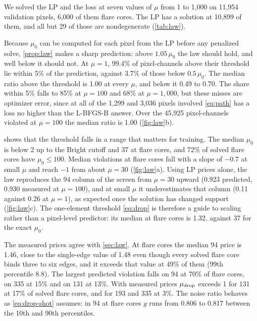 We solved the LP and the loss at seven values of $\mu$ from 1 to 1,000 on 11,954 validation pixels, 6,000 of them flare cores. The LP has a solution at 10,899 of them, and all but 29 of those are nondegenerate (\cref{tab:law}).

Because $\mu_0$ can be computed for each pixel from the LP before any penalized solve, \cref{prop:law} makes a sharp prediction: above $1.05\,\mu_0$ the law should hold, and well below it should not. At $\mu=1$, 99.4\% of pixel-channels above their threshold lie within 5\% of the prediction, against 3.7\% of those below $0.5\,\mu_0$. The median ratio above the threshold is 1.00 at every $\mu$, and below it 0.49 to 0.70. The share within 5\% falls to 85\% at $\mu=100$ and 68\% at $\mu=1{,}000$, but these misses are optimizer error, since at all of the 1,299 and 3,036 pixels involved \cref{eq:path} has a loss no higher than the L-BFGS-B answer. Over the 45,925 pixel-channels violated at $\mu=100$ the median ratio is 1.00 (\cref{fig:law}b).

 shows that the threshold falls in a range that matters for training. The median $\mu_0$ is below 2 up to the Bright cutoff and 37 at flare cores, and 72\% of solved flare cores have $\mu_0\le100$. Median violations at flare cores fall with a slope of $-0.7$ at small $\mu$ and reach $-1$ from about $\mu=30$ (\cref{fig:law}a). Using LP prices alone, the law reproduces the 94\Ang{} column of the screen from $\mu=30$ upward (0.923 predicted, 0.930 measured at $\mu=100$), and at small $\mu$ it underestimates that column (0.11 against 0.26 at $\mu=1$), as expected once the solution has changed support (\cref{fig:law}c). The one-element threshold \eqref{eq:drop} is therefore a guide to scaling rather than a pixel-level predictor: its median at flare cores is 1.32, against 37 for the exact $\mu_0$.

The measured prices agree with \cref{sec:law}. At flare cores the median 94\Ang{} price is 1.46, close to the single-edge value of 1.48 even though every solved flare core binds three to six edges, and it exceeds that value at 49\% of them (99th percentile 8.8). The largest predicted violation falls on 94\Ang{} at 70\% of flare cores, on 335\Ang{} at 15\% and on 131\Ang{} at 13\%. With measured prices $\mu_{\mathrm{drop}}$ exceeds 1 for 131\Ang{} at 17\% of solved flare cores, and for 193 and 335\Ang{} at 3\%. The noise ratio behaves as \cref{eq:drop-shot} assumes: in 94\Ang{} at flare cores $g$ runs from 0.806 to 0.817 between the 10th and 90th percentiles.

